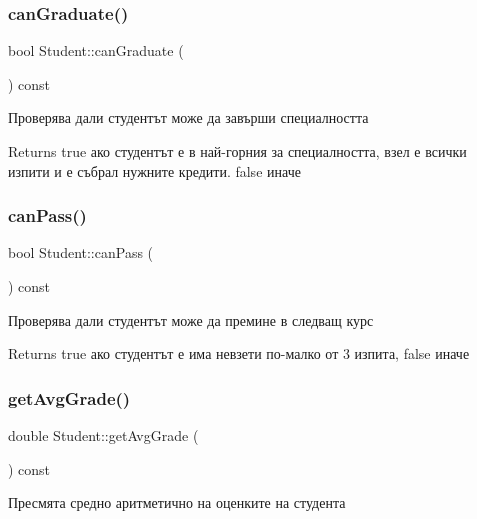 \subsubsection{\texorpdfstring{can\+Graduate()}{canGraduate()}}
{\footnotesize\ttfamily bool Student\+::can\+Graduate (\begin{DoxyParamCaption}{ }\end{DoxyParamCaption}) const}



Проверява дали студентът може да завърши специалността 

\begin{DoxyReturn}{Returns}
true ако студентът е в най-\/горния за специалността, взел е всички изпити и е събрал нужните кредити. false иначе 
\end{DoxyReturn}
\mbox{\label{class_student_a84aa35d558891ea41302326b5879a3ae}} 
\subsubsection{\texorpdfstring{can\+Pass()}{canPass()}}
{\footnotesize\ttfamily bool Student\+::can\+Pass (\begin{DoxyParamCaption}{ }\end{DoxyParamCaption}) const}



Проверява дали студентът може да премине в следващ курс 

\begin{DoxyReturn}{Returns}
true ако студентът е има невзети по-\/малко от 3 изпита, false иначе 
\end{DoxyReturn}
\mbox{\label{class_student_a44846b4e61b3424f590b3eae4d0c58b0}} 
\subsubsection{\texorpdfstring{get\+Avg\+Grade()}{getAvgGrade()}}
{\footnotesize\ttfamily double Student\+::get\+Avg\+Grade (\begin{DoxyParamCaption}{ }\end{DoxyParamCaption}) const}



Пресмята средно аритметично на оценките на студента 

